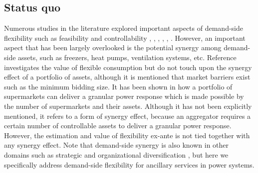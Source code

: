 \documentclass[conference]{IEEEtran}
\begin{document}

\vspace{1mm}
\subsection{Status quo}
\vspace{-1mm}
Numerous studies in the literature explored important aspects of demand-side flexibility such as feasibility and controllability \cite{bondy2018redefining}, \cite{bondy2017performance}, \cite{bondy2016procedure}, \cite{bondy2014performance}, \cite{biegel2014integration}, \cite{AchievingControllabilityofElectricLoads}. However, an important aspect that has been largely overlooked is the potential synergy among demand-side assets, such as freezers, heat pumps, ventilation systems, etc.
%
Reference \cite{biegel2014value} investigates the value of flexible consumption but do not touch upon the synergy effect of a portfolio of assets, although it is mentioned that market barriers exist such as the minimum bidding size.
%
It has been shown in \cite{pedersen2014aggregation} how a portfolio of supermarkets can deliver a granular power response which is made possible by the number of supermarkets and their assets. Although it has not been explicitly mentioned, it refers to a form of synergy effect, because an aggregator requires a certain number of controllable assets to deliver a granular power response. However, the estimation and value of flexibility ex-ante is not tied together with any synergy effect. Note that  demand-side synergy is also known in other domains such as strategic and organizational diversification \cite{ye2012achieving}, but here we specifically address demand-side flexibility for ancillary services in power systems.
\end{document}
